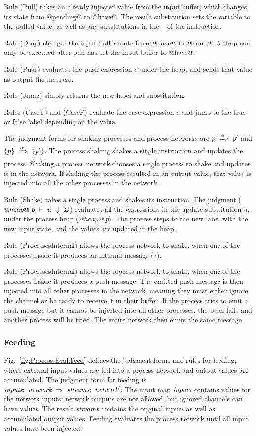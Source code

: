 Rule (Pull) takes an already injected value from the input buffer, which changes its state from @pending@ to @have@.
The result substitution sets the variable to the pulled value, as well as any substitutions in the \Next~ of the instruction.

Rule (Drop) changes the input buffer state from @have@ to @none@. A drop can only be executed after pull has set the input buffer to @have@.

Rule (Push) evaluates the push expression $e$ under the heap, and sends that value as output the message.

Rule (Jump) simply returns the new label and substitution.

Rules (CaseT) and (CaseF) evaluate the case expression $e$ and jump to the true or false label depending on the value.

The judgment forms for shaking processes and process networks are $p~\xRightarrow{\alpha}~p'$ and $\{ p \}~\xRightarrow{\alpha}~\{ p' \}$.
The process shaking shakes a single instruction and updates the process.
Shaking a process network chooses a single process to shake and updates it in the network.
If shaking the process resulted in an output value, that value is injected into all the other processes in the network.

Rule (Shake) takes a single process and shakes its instruction.
The judgment ($@heap@~p~\vdash~u~\Downarrow~\Sigma$) evaluates all the expressions in the update substitution $u$, under the process heap ($@heap@~p$).
The process steps to the new label with the new input state, and the values are updated in the heap.

Rule (ProcessesInternal) allows the process network to shake, when one of the processes inside it produces an internal message ($\tau$).

Rule (ProcessesInternal) allows the process network to shake, when one of the processes inside it produces a push message.
The emitted push message is then injected into all other processes in the network, meaning they must either ignore the channel or be ready to receive it in their buffer.
If the process tries to emit a push message but it cannot be injected into all other processes, the push fails and another process will be tried.
The entire network then emits the same message.


\subsubsection{Feeding}
Fig.~\ref{fig:Process:Eval:Feed} defines the judgment forms and rules for feeding, where external input values are fed into a process network and output values are accumulated.
The judgment form for feeding is $\textit{inputs};~\textit{network}~\Rightarrow~\textit{streams};~\textit{network}'$.
The input map $\textit{inputs}$ contains values for the network inputs: network outputs are not allowed, but ignored channels can have values.
The result $\textit{streams}$ contains the original inputs as well as accumulated output values.
Feeding evaluates the process network until all input values have been injected.

